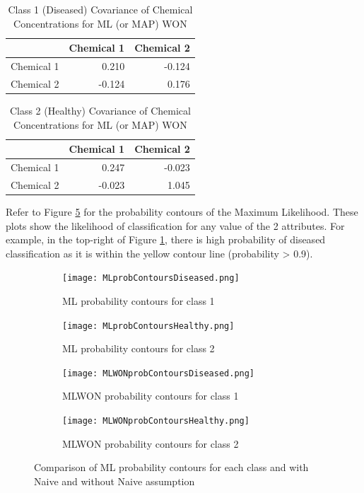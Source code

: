 \begin{table}[h]
	\centering
	\caption{Class 1 (Diseased) Covariance of Chemical Concentrations for ML (or MAP) WON}
	\label{t:cov1}
	\begin{tabular}{lrr}
		\hline
		\textbf{} & \textbf{Chemical 1} & \textbf{Chemical 2} \\ \hline
		Chemical 1 & 0.210 & -0.124 \\
		Chemical 2 & -0.124 & 0.176  \\
	\end{tabular}
\end{table}

\begin{table}[h]
	\centering
	\caption{Class 2 (Healthy) Covariance of Chemical Concentrations for ML (or MAP) WON}
	\label{t:cov2}
	\begin{tabular}{lrr}
		\hline
		\textbf{} & \textbf{Chemical 1} & \textbf{Chemical 2} \\ \hline
		Chemical 1 & 0.247 & -0.023 \\
		Chemical 2 & -0.023 & 1.045  \\
	\end{tabular}
\end{table}

Refer to Figure \ref{fig:CMLprob} for the probability contours of the Maximum Likelihood. These plots show the likelihood of classification for any value of the 2 attributes. For example, in the top-right of Figure \ref{fig:cmlprob1}, there is high probability of diseased classification as it is within the yellow contour line (probability > 0.9).

\begin{figure}[h!] 
	\centering
	\begin{subfigure}[b]{.40\textwidth}
		\texttt{[image: MLprobContoursDiseased.png]}
		\caption{ML probability contours for class 1}
		\label{fig:cmlprob1}
	\end{subfigure}
	\begin{subfigure}[b]{0.40\textwidth}
		\texttt{[image: MLprobContoursHealthy.png]}
		\caption{ML probability contours for class 2}
		\label{fig:model1}
	\end{subfigure}
	\begin{subfigure}[b]{.40\textwidth}
		\texttt{[image: MLWONprobContoursDiseased.png]}
		\caption{MLWON probability contours for class 1}
		\label{fig:model2}
	\end{subfigure}
	\begin{subfigure}[b]{.40\textwidth}
		\texttt{[image: MLWONprobContoursHealthy.png]}
		\caption{MLWON probability contours for class 2}
		\label{fig:model3}
	\end{subfigure}
	\caption{Comparison of ML probability contours for each class and with Naive and without Naive assumption}
	\label{fig:CMLprob}
\end{figure}


